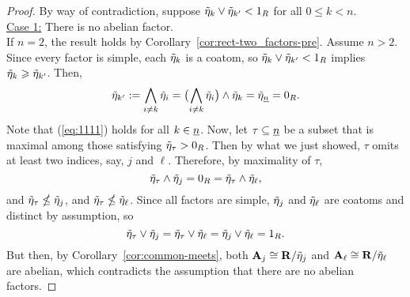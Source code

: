 \begin{proof}
    By way of contradiction, suppose 
    $\tilde{\eta}_k \vee \tilde{\eta}_{k'} < 1_R$ for all $0\leq k< n$. \\[5pt]
    \noindent \underline{Case 1:} There is no abelian factor.\\
    If $n=2$, the result holds by Corollary~\ref{cor:rect-two_factors-pre}.
    Assume $n>2$.
    Since every factor is simple, each $\tilde{\eta}_k$ is a coatom, so 
    $\tilde{\eta}_k \vee \tilde{\eta}_{k'} < 1_R$ implies $\tilde{\eta}_k \geqslant \tilde{\eta}_{k'}$.  
    Then,
    \begin{equation}
      \label{eq:1111}
      \etaR_{k'}:= \Meet_{i \neq k}\etaR_i 
      = \bigl(\Meet_{i \neq k}\etaR_i\bigr) \meet \etaR_k = \etaR_{\nn} = 0_R.
    \end{equation}
    Note that (\ref{eq:1111}) holds for all $k\in \underline{n}$.
    Now, let $\tau \subseteq \underline{n}$ be a subset that is maximal 
    among those satisfying $\tilde{\eta}_\tau > 0_R$.
    Then by what we just showed, $\tau$ omits at least two indices, say, $j$ and $\ell$.
    Therefore, by maximality of $\tau$,
    \begin{equation*}%
      \etaR_\tau \meet \etaR_j = 0_R = \etaR_\tau \meet \etaR_\ell,
    \end{equation*}  
    and $\tilde{\eta}_\tau \nleq \tilde{\eta}_j$, and $\tilde{\eta}_\tau \nleq \tilde{\eta}_\ell$.
    Since all factors are simple, $\tilde{\eta}_j$ and $\tilde{\eta}_\ell$ are coatoms and distinct by assumption, so
    \begin{equation*}%
      \etaR_\tau \join \etaR_j  = \etaR_\tau \join \etaR_\ell = \etaR_j\join \etaR_\ell = 1_R.
    \end{equation*}  
    But then, by Corollary~\ref{cor:common-meets}, both $\mathbf{A}_j \cong \mathbf{R}/\tilde{\eta}_j$ and 
    $\mathbf{A}_\ell\cong \mathbf{R}/\tilde{\eta}_\ell$ are abelian, which contradicts the assumption that 
    there are no abelian factors.

\end{proof}
